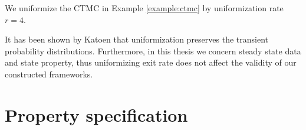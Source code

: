 \begin{example}
    We uniformize the CTMC in Example \ref{example:ctmc} by uniformization rate $r=4$.
    \begin{figure}[H]
        \centering
        \label{fig:uniformized-ctmc}
    \end{figure}
\end{example}
It has been shown by Katoen \cite{katoen2013model} that uniformization preserves the transient
probability distributions. Furthermore, in this thesis we concern steady state data and state
property, thus uniformizing exit rate does not affect the validity of our constructed frameworks.

\section{Property specification}
